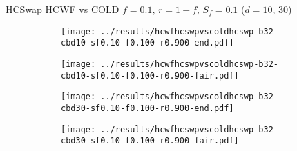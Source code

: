 \documentclass[8pt,a4paper]{beamer}
\begin{document}
	

	\begin{frame}{HCSwap HCWF vs COLD $f=0.1,\, r=1-f,\,S_f=0.1$  ($d=10,\, 30$)}
		\begin{figure}
			\begin{subfigure}{.48\textwidth}
				\centering
				\texttt{[image: ../results/hcwfhcswpvscoldhcswp-b32-cbd10-sf0.10-f0.100-r0.900-end.pdf]}
			\end{subfigure}
			\begin{subfigure}{.48\textwidth}
				\centering
				\texttt{[image: ../results/hcwfhcswpvscoldhcswp-b32-cbd10-sf0.10-f0.100-r0.900-fair.pdf]}
			\end{subfigure}
		\end{figure}
		
		\begin{figure}
			\begin{subfigure}{.48\textwidth}
				\centering
				\texttt{[image: ../results/hcwfhcswpvscoldhcswp-b32-cbd30-sf0.10-f0.100-r0.900-end.pdf]}
			\end{subfigure}
			\begin{subfigure}{.48\textwidth}
				\centering
				\texttt{[image: ../results/hcwfhcswpvscoldhcswp-b32-cbd30-sf0.10-f0.100-r0.900-fair.pdf]}
			\end{subfigure}
		\end{figure}
	\end{frame}
\end{document}
